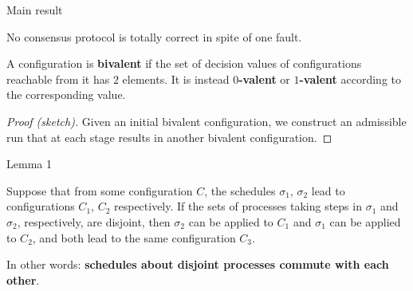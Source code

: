 \documentclass[12pt]{beamer}
\begin{document}
  \begin{frame}{Main result}
    \begin{theorem}
      No consensus protocol is totally correct in spite of one fault.
    \end{theorem}

    \vspace{0.25cm}

    A configuration is \textbf{bivalent} if the set of decision values of
    configurations reachable from it has \(2\) elements. It is instead
    \textbf{\(0\)-valent} or \textbf{\(1\)-valent} according to the
    corresponding value.

    \vspace{0.25cm}

    \begin{proof}[Proof (sketch)]
      Given an initial bivalent configuration, we construct an admissible run
      that at each stage results in another bivalent configuration.
    \end{proof}
  \end{frame}

  \begin{frame}{Lemma 1}
    \begin{lemma}
      Suppose that from some configuration \(C\), the schedules \(\sigma_1\),
      \(\sigma_2\) lead to configurations \(C_1\), \(C_2\) respectively. If the
      sets of processes taking steps in \(\sigma_1\) and \(\sigma_2\),
      respectively, are disjoint, then \(\sigma_2\) can be applied to \(C_1\)
      and \(\sigma_1\) can be applied to \(C_2\), and both lead to the same
      configuration \(C_3\).
    \end{lemma}

    \vspace{0.25cm}

    In other words: \textbf{schedules about disjoint processes commute with
    each other}.
  \end{frame}
\end{document}
